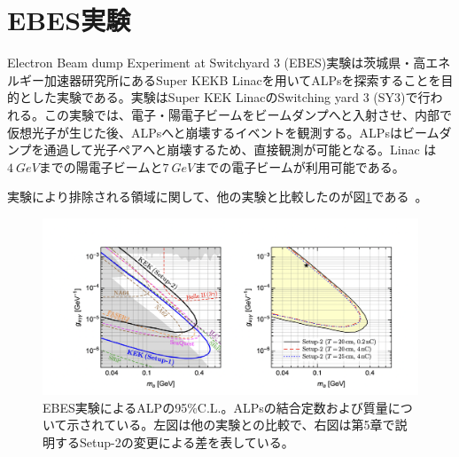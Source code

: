 \section{EBES実験}
Electron Beam dump Experiment at Switchyard 3 (EBES)実験は茨城県・高エネルギー加速器研究所にあるSuper KEKB Linacを用いてALPsを探索することを目的とした実験である。実験はSuper KEK  LinacのSwitching yard 3 (SY3)で行われる。この実験では、電子・陽電子ビームをビームダンプへと入射させ、内部で仮想光子が生じた後、ALPsへと崩壊するイベントを観測する。ALPsはビームダンプを通過して光子ペアへと崩壊するため、直接観測が可能となる。Linac は$\SI{4}{GeV}$までの陽電子ビームと$\SI{7}{GeV}$までの電子ビームが利用可能である。

実験により排除される領域に関して、他の実験と比較したのが図\ref{ALP_world}である~\cite{EBES}。

\begin{figure}[h]
	\begin{center}
		\includegraphics[width=370pt]{./Figure/Introduction/ALP_world.png}
		\caption[EBES実験によるALPの95\%C.L.]{EBES実験によるALPの95\%C.L.。ALPsの結合定数および質量について示されている。左図は他の実験との比較で、右図は第5章で説明するSetup-2の変更による差を表している。}
		\label{ALP_world}
	\end{center}
\end{figure}

